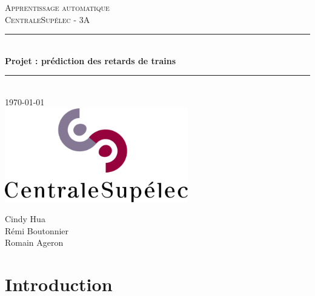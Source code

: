 \documentclass{article}
\begin{document}
\begin{titlepage}
        \newcommand{\HRule}{\rule{\linewidth}{0.5mm}}
        \begin{center}
            \textsc{\LARGE{} Apprentissage automatique} \\[0.5cm] 
            \textsc{\Large{} CentraleSupélec - 3A} \\[0.5cm]
            \HRule \\[0.6cm]
            {\huge\bfseries{} Projet : prédiction des retards de trains} \\[0.25cm]
            \HRule \\[1.5cm]
            {\large\today} \\[2cm] 
            \includegraphics[width=8cm]{LogoCS.png}
            \\[2cm] 
        \end{center}
        \vfill{}
        
        \begin{center}
        \Large{
            {Cindy Hua}\\
            {Rémi Boutonnier}\\
            {Romain Ageron}}
        \end{center} 
\end{titlepage}

   
    
\tableofcontents

\newpage

\section{Introduction}
\end{document}
